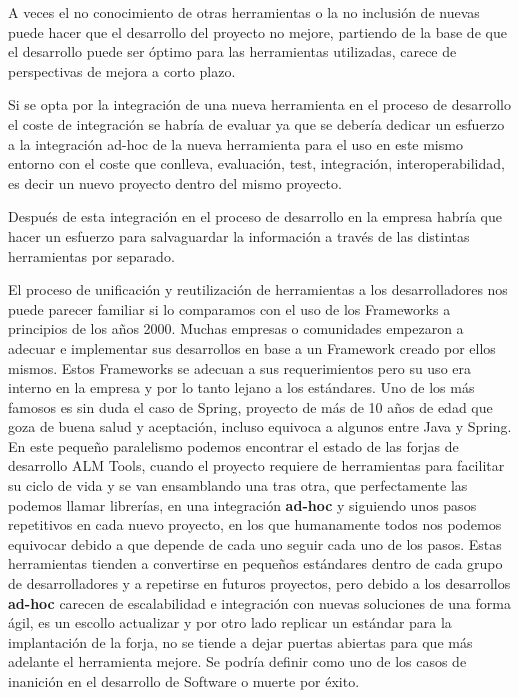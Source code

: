 \par A veces el no conocimiento de otras herramientas o la no inclusión de nuevas puede hacer que el desarrollo del proyecto no mejore, partiendo de la base de que el desarrollo puede ser óptimo para las herramientas utilizadas, carece de perspectivas de mejora a corto plazo.

\par Si se opta por la integración de una nueva herramienta en el proceso de desarrollo el coste de integración se habría de evaluar ya que se debería dedicar un esfuerzo a la integración ad-hoc de la nueva herramienta para el uso en este mismo entorno con el coste que conlleva, evaluación, test, integración, interoperabilidad, es decir un nuevo proyecto dentro del mismo proyecto.

\par Después de esta integración en el proceso de desarrollo en la empresa habría que hacer un esfuerzo para salvaguardar la información a través de las distintas herramientas por separado.

\par El proceso de unificación y reutilización de herramientas a los desarrolladores nos puede parecer familiar si lo comparamos con el uso de los Frameworks a principios de los años 2000. Muchas empresas o comunidades empezaron a adecuar e implementar sus desarrollos en base a un Framework creado por ellos mismos. Estos Frameworks se adecuan a sus requerimientos pero su uso era interno en la empresa y por lo tanto lejano a los estándares. Uno de los más famosos es sin duda el caso de Spring, proyecto de más de 10 años de edad que goza de buena salud y aceptación, incluso equivoca a algunos entre Java y Spring. En este pequeño paralelismo podemos encontrar el estado de las forjas de desarrollo ALM Tools, cuando el proyecto requiere de herramientas para facilitar su ciclo de vida y se van ensamblando una tras otra, que perfectamente las podemos llamar librerías, en una integración \textbf{ad-hoc} y siguiendo unos pasos repetitivos en cada nuevo proyecto, en los que humanamente todos nos podemos equivocar debido a que depende de cada uno seguir cada uno de los pasos. Estas herramientas tienden a convertirse en pequeños estándares dentro de cada grupo de desarrolladores y a repetirse en futuros proyectos, pero debido a los desarrollos \textbf{ad-hoc} carecen de escalabilidad e integración con nuevas soluciones de una forma ágil, es un escollo actualizar y por otro lado replicar un estándar para la implantación de la forja, no se tiende a dejar puertas abiertas para que más adelante el herramienta mejore. Se podría definir como uno de los casos de inanición en el desarrollo de Software o muerte por éxito.

